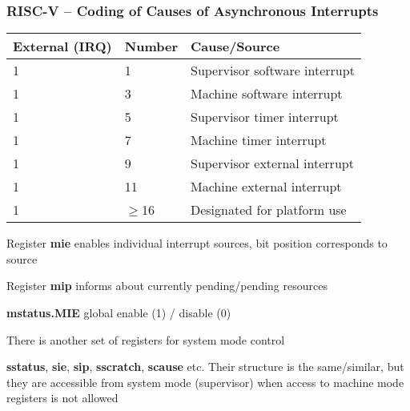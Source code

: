 \documentclass{beamer}
\begin{document}
\begin{frame}
\frametitle{RISC-V -- Coding of Causes of Asynchronous Interrupts}

\begin{center}
\small
\begin{tabular}{|l|l|l|}  \hline
External (IRQ) & Number & Cause/Source \\\hline
1 & 1 & Supervisor software interrupt \\\hline
1 & 3 & Machine software interrupt \\\hline
1 & 5 & Supervisor timer interrupt \\\hline
1 & 7 & Machine timer interrupt \\\hline
1 & 9 & Supervisor external interrupt \\\hline
1 & 11 & Machine external interrupt \\\hline
1 & $\ge$16  & Designated for platform use \\\hline
\end{tabular}
\end{center}

\small
Register \textbf{mie} enables individual interrupt sources, bit position corresponds to
source

Register \textbf{mip} informs about currently pending/pending resources

\textbf{mstatus.MIE} global enable (1) / disable (0)

There is another set of registers for system mode control

\textbf{sstatus}, \textbf{sie}, \textbf{sip}, \textbf{sscratch}, \textbf{scause} etc. Their structure is
the same/similar, but they are accessible from system mode (supervisor) when access to machine mode registers is not allowed

\end{frame}
\end{document}
